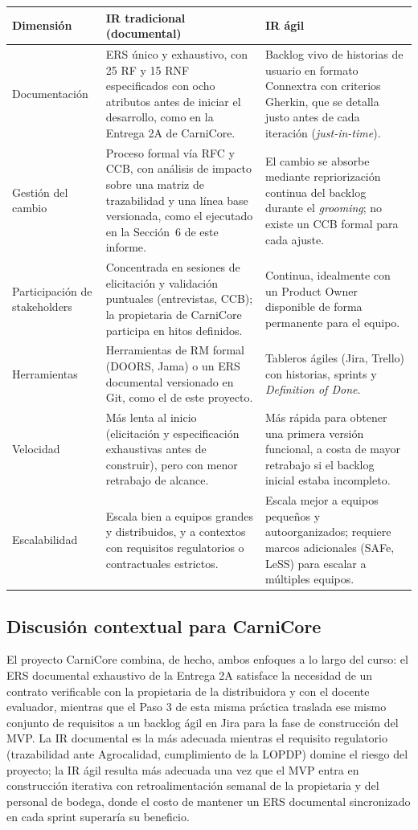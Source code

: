 \documentclass[11pt,a4paper]{article}
\begin{document}
\begin{longtable}{|p{2.6cm}|p{5.6cm}|p{5.6cm}|}
\hline
\textbf{Dimensión} & \textbf{IR tradicional (documental)} & \textbf{IR ágil} \\
\hline
Documentación & ERS único y exhaustivo, con 25 RF y 15 RNF especificados con ocho atributos antes de iniciar el desarrollo, como en la Entrega 2A de CarniCore. & Backlog vivo de historias de usuario en formato Connextra con criterios Gherkin, que se detalla justo antes de cada iteración (\textit{just-in-time}). \\
\hline
Gestión del cambio & Proceso formal vía RFC y CCB, con análisis de impacto sobre una matriz de trazabilidad y una línea base versionada, como el ejecutado en la Sección~6 de este informe. & El cambio se absorbe mediante repriorización continua del backlog durante el \textit{grooming}; no existe un CCB formal para cada ajuste. \\
\hline
Participación de \mbox{stakeholders} & Concentrada en sesiones de elicitación y validación puntuales (entrevistas, CCB); la propietaria de CarniCore participa en hitos definidos. & Continua, idealmente con un Product Owner disponible de forma permanente para el equipo. \\
\hline
Herramientas & Herramientas de RM formal (DOORS, Jama) o un ERS documental versionado en Git, como el de este proyecto. & Tableros ágiles (Jira, Trello) con historias, sprints y \textit{Definition of Done}. \\
\hline
Velocidad & Más lenta al inicio (elicitación y especificación exhaustivas antes de construir), pero con menor retrabajo de alcance. & Más rápida para obtener una primera versión funcional, a costa de mayor retrabajo si el backlog inicial estaba incompleto. \\
\hline
Escalabilidad & Escala bien a equipos grandes y distribuidos, y a contextos con requisitos regulatorios o contractuales estrictos. & Escala mejor a equipos pequeños y autoorganizados; requiere marcos adicionales (SAFe, LeSS) para escalar a múltiples equipos. \\
\hline
\end{longtable}

\subsection{Discusión contextual para CarniCore}
El proyecto CarniCore combina, de hecho, ambos enfoques a lo largo del curso: el ERS documental exhaustivo de la Entrega 2A satisface la necesidad de un contrato verificable con la propietaria de la distribuidora y con el docente evaluador, mientras que el Paso 3 de esta misma práctica traslada ese mismo conjunto de requisitos a un backlog ágil en Jira para la fase de construcción del MVP. La IR documental es la más adecuada mientras el requisito regulatorio (trazabilidad ante Agrocalidad, cumplimiento de la LOPDP) domine el riesgo del proyecto; la IR ágil resulta más adecuada una vez que el MVP entra en construcción iterativa con retroalimentación semanal de la propietaria y del personal de bodega, donde el costo de mantener un ERS documental sincronizado en cada sprint superaría su beneficio.
\end{document}
